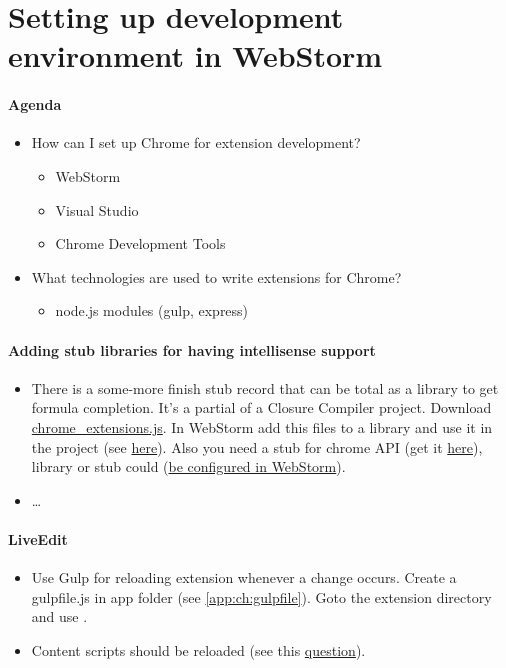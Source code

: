 \section{Setting up development environment in WebStorm}
\paragraph{Agenda}
\begin{itemize}
\item How can I set up Chrome for extension development?
\begin{itemize}
	\item WebStorm
	\item Visual Studio
	\item Chrome Development Tools
\end{itemize}
\item What technologies are used to write extensions for Chrome?
\begin{itemize}
	\item node.js modules (gulp, express)
\end{itemize}

\end{itemize}
\paragraph{Adding stub libraries for having intellisense support}
\begin{itemize}
	\item There is a some-more finish stub record that can be total as a library to get formula completion. It's a partial of a Closure Compiler project. Download \href{https://github.com/google/closure-compiler/blob/master/contrib/externs/chrome_extensions.js}{chrome\_extensions.js}.
	In WebStorm add this files to a library and use it in the project (see \href{http://stackoverflow.com/questions/13997468/how-do-i-use-webstorm-for-chrome-extension-development/25466708#25466708}{here}).
	Also you need a stub for chrome API (get it \href{https://github.com/linux-china/chrome_js_api_stub}{here}), library or stub could  (\href{https://www.jetbrains.com/webstorm/help/configuring-javascript-libraries.html}{be configured in WebStorm}).
	\item \dots
\end{itemize}
\paragraph{LiveEdit}
\begin{itemize}
	\item Use Gulp for reloading extension whenever a change occurs. Create a gulpfile.js in app folder (see \ref{app:ch:gulpfile}).	
	Goto the extension directory and use .
	\item Content scripts should be reloaded (see this \href{http://stackoverflow.com/questions/10994324/chrome-extension-content-script-re-injection-after-upgrade-or-install}{question}).
\end{itemize}
